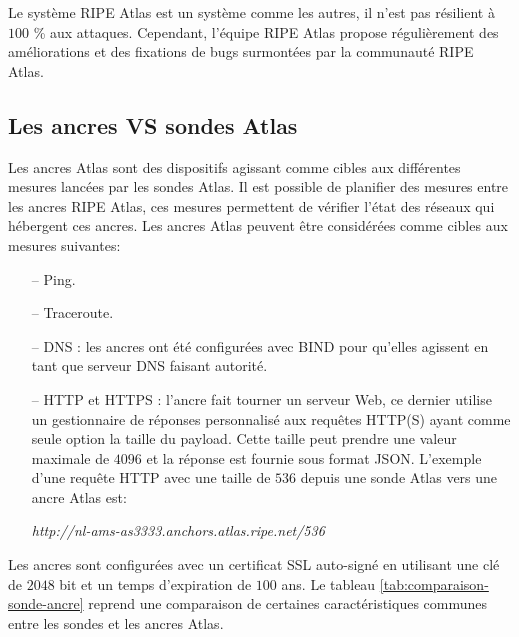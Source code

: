 Le système RIPE Atlas est un système comme les autres, il n'est pas résilient à $100$ \% aux attaques. Cependant, l'équipe RIPE Atlas propose régulièrement des améliorations et des fixations de bugs surmontées par la communauté RIPE Atlas. 


\subsection{Les ancres VS sondes  Atlas} \label{subsec:ancre}

Les ancres  Atlas sont des dispositifs agissant comme cibles aux différentes mesures lancées par les sondes  Atlas. Il est possible de planifier des mesures entre les ancres RIPE Atlas, ces mesures permettent de vérifier l'état des réseaux qui hébergent ces ancres. Les ancres Atlas peuvent être considérées comme  cibles aux mesures suivantes:
\begin{itemize}
	\item[--] Ping.
	\item[--]Traceroute.
	\item[--]DNS : les ancres ont été configurées avec BIND pour qu'elles agissent en tant que serveur DNS faisant autorité.
	\item[--]HTTP et HTTPS : l'ancre fait tourner un serveur Web, ce dernier utilise un gestionnaire de réponses personnalisé aux requêtes HTTP(S) ayant comme seule option la taille du payload. 	 Cette taille peut prendre une valeur maximale de $4096$ et la réponse est fournie sous format JSON. L'exemple d'une requête HTTP avec une taille de $536$ depuis une sonde Atlas vers une ancre Atlas est: 
	\begin{center}
		\begin{tcolorbox}
			\textit{http://nl-ams-as3333.anchors.atlas.ripe.net/536}
		\end{tcolorbox}
	\end{center}
\end{itemize}
Les ancres sont configurées avec un certificat SSL auto-signé en utilisant une clé de $2048$ bit et un temps d'expiration de $100$ ans. Le tableau \ref{tab:comparaison-sonde-ancre} reprend une comparaison de certaines caractéristiques communes entre les sondes et les ancres  Atlas.

